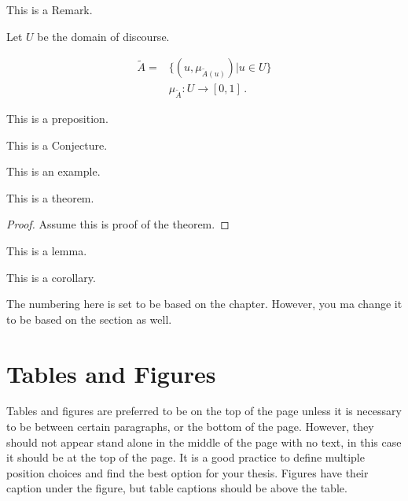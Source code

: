 \documentclass[a4paper,12pt,oneside]{report}
\begin{document}
\begin{remark}
This is a Remark.
\end{remark}

\begin{definition}
Let $U$ be the domain of discourse.
\end{definition}

\begin{eqnarray}
\label{fuzzy_set}
\tilde{A}=&\{(u,\mu_{\tilde{A}(u)})| u \in U\}
\nonumber
\\
&\mu_{\tilde{A}}:U \longrightarrow [0,1]
\,.
\end{eqnarray}

\begin{proposition}
This is a preposition.
\end{proposition}

\begin{conjecture}
This is a Conjecture.
\end{conjecture}

\begin{example}
This is an example. 
\end{example}

\begin{theorem}
This is a theorem.
\end{theorem}
\begin{proof} 
Assume this is proof of the theorem.
\end{proof}


\begin{lemma}
This is a lemma. 
\end{lemma}

\begin{corollary}
This is a corollary. 
\end{corollary}

The numbering here is set to be based on the chapter. However, you ma change it to be based on the section as well.

\section{Tables and Figures}\label{sec:tablesandfigures}
Tables and figures are preferred to be on the top of the page unless it is necessary to be between certain paragraphs, or the bottom of the page. However, they should not appear stand alone in the middle of the page with no text, in this case it should be at the top of the page. It is a good practice to define multiple position choices and find the best option for your thesis. Figures have their caption under the figure, but table captions should be above the table.
\end{document}

